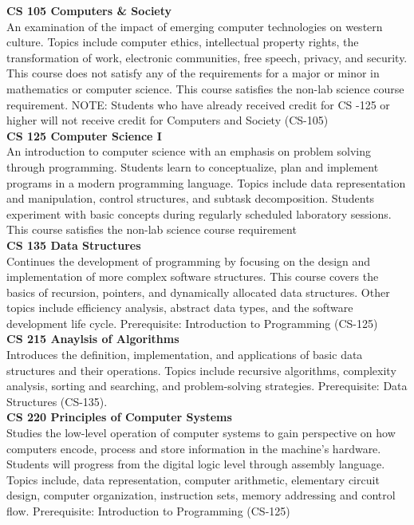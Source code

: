 \documentclass[
  letterpaper,
]{scrbook}
\begin{document}
\textbf{CS 105 Computers \& Society}\\
An examination of the impact of emerging computer technologies on
western culture. Topics include computer ethics, intellectual property
rights, the transformation of work, electronic communities, free speech,
privacy, and security. This course does not satisfy any of the
requirements for a major or minor in mathematics or computer science.
This course satisfies the non-lab science course requirement. NOTE:
Students who have already received credit for CS -125 or higher will not
receive credit for Computers and Society (CS-105)\\
\textbf{CS 125 Computer Science I}\\
An introduction to computer science with an emphasis on problem solving
through programming. Students learn to conceptualize, plan and implement
programs in a modern programming language. Topics include data
representation and manipulation, control structures, and subtask
decomposition. Students experiment with basic concepts during regularly
scheduled laboratory sessions. This course satisfies the non-lab science
course requirement\\
\textbf{CS 135 Data Structures}\\
Continues the development of programming by focusing on the design and
implementation of more complex software structures. This course covers
the basics of recursion, pointers, and dynamically allocated data
structures. Other topics include efficiency analysis, abstract data
types, and the software development life cycle. Prerequisite:
Introduction to Programming (CS-125)\\
\textbf{CS 215 Anaylsis of Algorithms}\\
Introduces the definition, implementation, and applications of basic
data structures and their operations. Topics include recursive
algorithms, complexity analysis, sorting and searching, and
problem-solving strategies. Prerequisite: Data Structures (CS-135).\\
\textbf{CS 220 Principles of Computer Systems}\\
Studies the low-level operation of computer systems to gain perspective
on how computers encode, process and store information in the machine's
hardware. Students will progress from the digital logic level through
assembly language. Topics include, data representation, computer
arithmetic, elementary circuit design, computer organization,
instruction sets, memory addressing and control flow. Prerequisite:
Introduction to Programming (CS-125)\\
\end{document}
